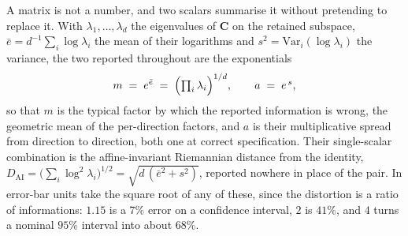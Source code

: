 A matrix is not a number, and two scalars summarise it without pretending to replace it. With $\lambda_1,\dots,\lambda_d$ the
eigenvalues of $\mathbf{C}$ on the retained subspace, $\bar e = d^{-1}\sum_i \log\lambda_i$ the mean
of their logarithms and $s^2 = \mathrm{Var}_i(\log\lambda_i)$ the variance, the two reported
throughout are the exponentials
\begin{equation}
  m \;=\; e^{\bar e} \;=\; \Bigl(\textstyle\prod_i \lambda_i\Bigr)^{1/d},
  \qquad
  a \;=\; e^{\,s},
  \label{eq:magnitude-anisotropy}
\end{equation}
so that $m$ is the typical factor by which the reported information is wrong, the geometric mean of
the per-direction factors, and $a$ is their multiplicative spread from direction to direction, both
one at correct specification. Their single-scalar combination is the affine-invariant Riemannian
distance from the identity,
$D_{\mathrm{AI}} = \bigl(\sum_i \log^2\lambda_i\bigr)^{1/2} = \sqrt{d\,(\bar e^2 + s^2)}$, reported
nowhere in place of the pair. In error-bar units take the square root of any of these, since the
distortion is a ratio of informations: $1.15$ is a $7\%$ error on a confidence interval, $2$ is
$41\%$, and $4$ turns a nominal $95\%$ interval into about $68\%$.
